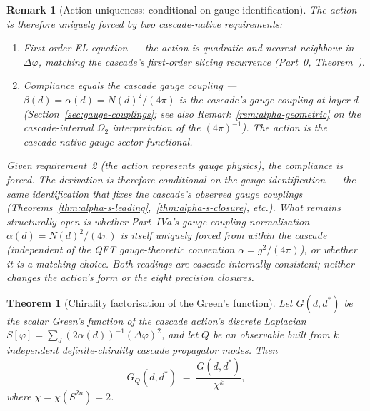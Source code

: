 \documentclass[12pt,a4paper]{article}
\newtheorem{theorem}{Theorem}[section]
\newtheorem*{remark}{Remark}
\begin{document}
\begin{remark}[Action uniqueness: conditional on gauge identification]
The action is therefore uniquely forced by two cascade-native requirements:
\begin{enumerate}[nosep]
\item \emph{First-order EL equation} --- the action is quadratic and
nearest-neighbour in $\Delta\varphi$, matching the cascade's first-order
slicing recurrence (Part~0, Theorem~).
\item \emph{Compliance equals the cascade gauge coupling} --- $\beta(d) = \alpha(d) = N(d)^2/(4\pi)$ is the cascade's gauge coupling at layer $d$ (Section~\ref{sec:gauge-couplings}; see also Remark~\ref{rem:alpha-geometric} on the cascade-internal $\Omega_2$ interpretation of the $(4\pi)^{-1}$).
The action is the cascade-native gauge-sector functional.
\end{enumerate}

Given requirement~2 (the action represents gauge physics), the compliance is
forced. The derivation is therefore \emph{conditional} on the gauge
identification --- the same identification that fixes the cascade's
observed gauge couplings (Theorems~\ref{thm:alpha-s-leading},~\ref{thm:alpha-s-closure},
etc.). What remains structurally open is whether Part~IVa's gauge-coupling
normalisation $\alpha(d) = N(d)^2/(4\pi)$ is itself uniquely forced from
within the cascade (independent of the QFT gauge-theoretic convention
$\alpha = g^2/(4\pi)$), or whether it is a matching choice. Both readings
are cascade-internally consistent; neither changes the action's form or
the eight precision closures.
\end{remark}

\begin{theorem}[Chirality factorisation of the Green's function]\label{thm:chirality-factorisation}
Let $G(d,d^*)$ be the scalar Green's function of the cascade action's discrete Laplacian $S[\varphi]=\sum_d(2\alpha(d))^{-1}(\Delta\varphi)^2$, and let $Q$ be an observable built from $k$ independent definite-chirality cascade propagator modes. Then
\[
G_Q(d,d^*) \;=\; \frac{G(d,d^*)}{\chi^k},
\]
where $\chi=\chi(S^{2n})=2$.
\end{theorem}
\end{document}
